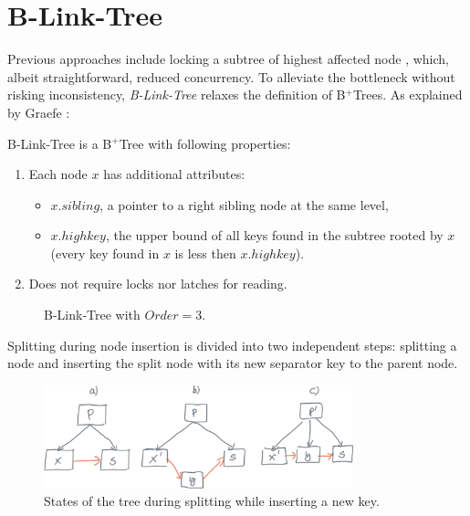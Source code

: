 \section{B-Link-Tree}\label{section:b-link-tree}

Previous approaches include locking a subtree of highest affected node \cite{samadi1976b}, which, albeit straightforward, reduced concurrency. To alleviate the bottleneck without risking inconsistency, \textit{B-Link-Tree} relaxes the definition of B$^+$Trees. As explained by Graefe \cite{goetz-tech}:

\begin{definition}
  B-Link-Tree is a B$^+$Tree with following properties:
  \begin{enumerate}
    \item Each node $x$ has additional attributes:
          \begin{itemize}
            \item $x.sibling$, a pointer to a right sibling node at the same level,
            \item $x.highkey$, the upper bound of all keys found in the subtree rooted by $x$ (every key found in $x$ is less then $x.highkey$).
          \end{itemize}
    \item Does not require locks nor latches for reading.
  \end{enumerate}
\end{definition}

\begin{figure}
  \centering
  
  \caption{B-Link-Tree with $\mathit{Order} = 3$.}
\end{figure}

Splitting during node insertion is divided into two independent steps: splitting a node and inserting the split node with its new separator key to the parent node.

\begin{figure}[H]
  \centering
  \includegraphics[width=0.8\textwidth ]{components/figure/b-link-insert}
  \caption{States of the tree during splitting while inserting a new key.}
  \label{figure:b-link-insert}
\end{figure}


